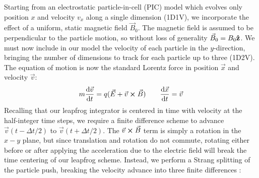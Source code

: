 \documentclass[%
 reprint,
 amsmath,amssymb,
 aps,
]{revtex4-2}
\begin{document}
Starting from an electrostatic particle-in-cell (PIC) model which evolves only position $x$ and velocity $v_x$ along a single dimension (1D1V), we incorporate the effect of a uniform, static magnetic field $\vec B_0$. The magnetic field is assumed to be perpendicular to the particle motion, so without loss of generality $\vec B_0 = B_0 \vu z$. We must now include in our model the velocity of each particle in the $y$-direction, bringing the number of dimensions to track for each particle up to three (1D2V). The equation of motion is now the standard Lorentz force in position $\vec x$ and velocity $\vec v$:
\begin{equation}
m \dv{\vec v}{t} = q (\vec E + \vec v \cross \vec B) \qquad \dv{\vec x}{t} = \vec v
\end{equation}
Recalling that our leapfrog integrator is centered in time with velocity at the half-integer time steps, we require a finite difference scheme to advance $\vec v(t - \Delta t / 2)$ to $\vec v(t + \Delta t / 2)$. The $\vec v \cross \vec B$ term is simply a rotation in the $x-y$ plane, but since translation and rotation do not commute, rotating either before or after applying the acceleration due to the electric field will break the time centering of our leapfrog scheme. Instead, we perform a Strang splitting of the particle push, breaking the velocity advance into three finite differences \cite{BirdsallCharlesK1991Ppvc}:
\end{document}
